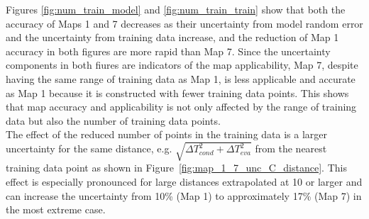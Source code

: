 Figures \ref{fig:num_train_model} and \ref{fig:num_train_train} show that both the accuracy of Maps 1 and 7 decreases as their uncertainty from model random error and the uncertainty from training data increase, and the reduction of Map 1 accuracy in both figures are more rapid than Map 7. Since the uncertainty components in both fiures are indicators of the map applicability, Map 7, despite having the same range of training data as Map 1, is less applicable and accurate as Map 1 because it is constructed with fewer training data points. This shows that map accuracy and applicability is not only affected by the range of training data but also the number of training data points.\\
The effect of the reduced number of points in the training data is a larger uncertainty for the same distance, e.g. $\sqrt{\Delta T_{cond}^2 + \Delta T_{eva}^2}$ from the nearest training data point as shown in Figure~\ref{fig:map_1_7_unc_C_distance}.  This effect is especially pronounced for large distances extrapolated at 10\dgC{} or larger and can increase the uncertainty from 10\% (Map 1) to approximately 17\% (Map 7) in the most extreme case.

